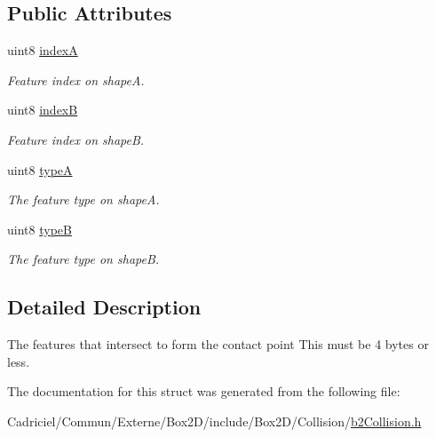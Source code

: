 \subsection*{Public Attributes}
\begin{DoxyCompactItemize}
\item 
uint8 \hyperlink{structb2_contact_feature_a833bc746e7cb5e3cd458f1c0809101d0}{indexA}\hypertarget{structb2_contact_feature_a833bc746e7cb5e3cd458f1c0809101d0}{}\label{structb2_contact_feature_a833bc746e7cb5e3cd458f1c0809101d0}

\begin{DoxyCompactList}\small\item\em Feature index on shapeA. \end{DoxyCompactList}\item 
uint8 \hyperlink{structb2_contact_feature_ad96712b6a0cc1f4b22b85b5948eab81d}{indexB}\hypertarget{structb2_contact_feature_ad96712b6a0cc1f4b22b85b5948eab81d}{}\label{structb2_contact_feature_ad96712b6a0cc1f4b22b85b5948eab81d}

\begin{DoxyCompactList}\small\item\em Feature index on shapeB. \end{DoxyCompactList}\item 
uint8 \hyperlink{structb2_contact_feature_a3361b651f0a88fb60ec6aba9f4921cc2}{typeA}\hypertarget{structb2_contact_feature_a3361b651f0a88fb60ec6aba9f4921cc2}{}\label{structb2_contact_feature_a3361b651f0a88fb60ec6aba9f4921cc2}

\begin{DoxyCompactList}\small\item\em The feature type on shapeA. \end{DoxyCompactList}\item 
uint8 \hyperlink{structb2_contact_feature_abb74afd6ee5b60834a3f8e2616182bdf}{typeB}\hypertarget{structb2_contact_feature_abb74afd6ee5b60834a3f8e2616182bdf}{}\label{structb2_contact_feature_abb74afd6ee5b60834a3f8e2616182bdf}

\begin{DoxyCompactList}\small\item\em The feature type on shapeB. \end{DoxyCompactList}\end{DoxyCompactItemize}


\subsection{Detailed Description}
The features that intersect to form the contact point This must be 4 bytes or less. 

The documentation for this struct was generated from the following file\+:\begin{DoxyCompactItemize}
\item 
Cadriciel/\+Commun/\+Externe/\+Box2\+D/include/\+Box2\+D/\+Collision/\hyperlink{b2_collision_8h}{b2\+Collision.\+h}\end{DoxyCompactItemize}
